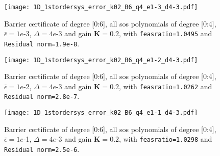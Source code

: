 \begin{figure}[htbp]
\centering
\texttt{[image: 1D\_1stordersys\_error\_k02\_B6\_q4\_e1-3\_d4-3.pdf]}
\caption{Barrier certificate of degree [0:6], all \gls{sos} polynomials of degree [0:4], $\bar{\epsilon}=1e$-3, $\Delta=4e$-3 and gain $\textbf{K}=0.2$, with \texttt{feasratio=1.0495} and \texttt{Residual norm=1.9e-8}.}
\label{fig:1D_1stordersys_error_k02_B6_q4_e1-3_d4-3}
\end{figure}


\begin{figure}[htbp]
\centering
\texttt{[image: 1D\_1stordersys\_error\_k02\_B6\_q4\_e1-2\_d4-3.pdf]}
\caption{Barrier certificate of degree [0:6], all \gls{sos} polynomials of degree [0:4], $\bar{\epsilon}=1e$-2, $\Delta=4e$-3 and gain $\textbf{K}=0.2$, with \texttt{feasratio=1.0262} and \texttt{Residual norm=2.8e-7}.}
\label{fig:1D_1stordersys_error_k02_B6_q4_e1-2_d4-3}
\end{figure}


\begin{figure}[htbp]
\centering
\texttt{[image: 1D\_1stordersys\_error\_k02\_B6\_q4\_e1-1\_d4-3.pdf]}
\caption{Barrier certificate of degree [0:6], all \gls{sos} polynomials of degree [0:4], $\bar{\epsilon}=1e$-1, $\Delta=4e$-3 and gain $\textbf{K}=0.2$, with \texttt{feasratio=1.0298} and \texttt{Residual norm=2.5e-6}.}
\label{fig:1D_1stordersys_error_k02_B6_q4_e1-1_d4-3}
\end{figure}



